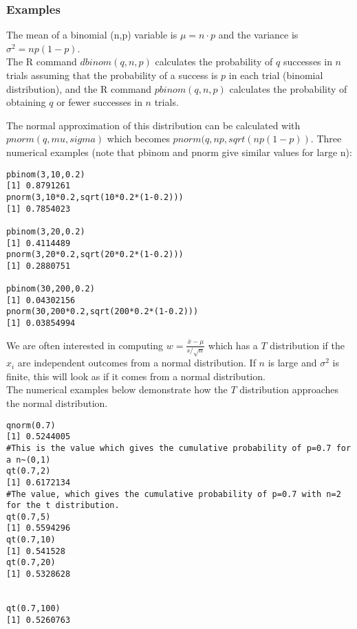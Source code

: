 \documentclass[12pt,a4paper]{article}
\theoremstyle{regla}
\theoremstyle{remark}
\theoremstyle{definition}
\theoremstyle{nonumberbreak}
\begin{document}
\subsubsection{Examples}
\begin{xmpl}

The mean of a binomial (n,p) variable is $\mu=n\cdot p$ and the variance is $\sigma^2=np(1-p)$.\\

The R command $dbinom(q,n,p)$ calculates the probability of $q$ successes in $n$ trials assuming that the probability of a success is $p$ in each trial (binomial distribution), and the R command $pbinom(q,n,p)$ calculates the probability of obtaining $q$ or fewer successes in $n$ trials.

The normal approximation of this distribution can be calculated with $pnorm(q,mu,sigma)$ which becomes $pnorm(q,np,sqrt(np(1-p))$. Three numerical examples (note that pbinom and pnorm give similar values for large n):
\begin{lstlisting}
pbinom(3,10,0.2)
[1] 0.8791261
pnorm(3,10*0.2,sqrt(10*0.2*(1-0.2)))
[1] 0.7854023

pbinom(3,20,0.2)
[1] 0.4114489
pnorm(3,20*0.2,sqrt(20*0.2*(1-0.2)))
[1] 0.2880751

pbinom(30,200,0.2)
[1] 0.04302156
pnorm(30,200*0.2,sqrt(200*0.2*(1-0.2)))
[1] 0.03854994
\end{lstlisting}
\end{xmpl}
\begin{xmpl}


We are often interested in computing $w=\frac{\bar{x}-\mu}{s/\sqrt{n}}$ which has a $T$ distribution if the $x_i$ are independent outcomes from a normal distribution. If $n$ is large and $\sigma^2$ is finite, this will look as if it comes from a normal distribution.\\

The numerical examples below demonstrate how the $T$ distribution approaches the normal distribution.

\begin{lstlisting}
qnorm(0.7)
[1] 0.5244005 
#This is the value which gives the cumulative probability of p=0.7 for a n~(0,1)
qt(0.7,2)
[1] 0.6172134
#The value, which gives the cumulative probability of p=0.7 with n=2 for the t distribution.
qt(0.7,5)
[1] 0.5594296
qt(0.7,10)
[1] 0.541528
qt(0.7,20)
[1] 0.5328628


qt(0.7,100)
[1] 0.5260763
\end{lstlisting}
\end{xmpl}
\end{document}
